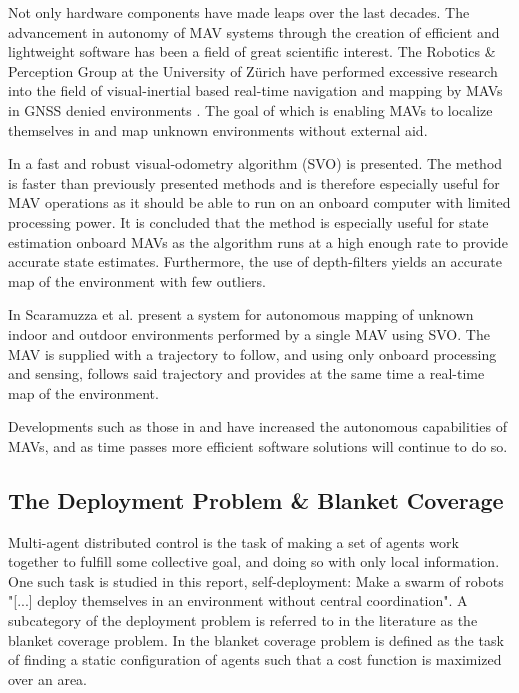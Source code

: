 Not only hardware components have made leaps over the last decades. The advancement in autonomy of MAV systems through the creation of efficient and lightweight software has been a field of great scientific interest.
The Robotics \& Perception Group at the University of Z\"urich have performed excessive research into the field of visual-inertial based real-time navigation and mapping
by MAVs in GNSS denied environments \cite{svo2, svo1}. The goal of which is enabling MAVs to localize themselves in and map unknown environments without external aid.

In \cite{svo2} a fast and robust visual-odometry algorithm (SVO) is presented. The method is faster than previously presented methods and is therefore especially useful 
for MAV operations as it should be able to run on an onboard computer with limited processing power. It is concluded that the method is especially useful for state estimation onboard MAVs as the algorithm runs
at a high enough rate to provide accurate state estimates. Furthermore, the use of depth-filters yields an accurate map of the environment with few outliers.

In \cite{svo1} Scaramuzza et al. present a system for autonomous mapping of unknown indoor and outdoor environments performed by a single MAV using SVO. The MAV is supplied with 
a trajectory to follow, and using only onboard processing and sensing, follows said trajectory and provides at the same time a real-time map of the environment.

Developments such as those in \cite{svo2} and \cite{svo1} have increased the autonomous capabilities of MAVs, and as time passes more efficient software solutions will continue to do so.

\subsection{The Deployment Problem \& Blanket Coverage}
Multi-agent distributed control is the task of making a set of agents work together to fulfill some collective goal, and doing so 
with only local information. One such task is studied in this report, self-deployment: Make a swarm of robots "[...] deploy 
themselves in an environment without central coordination"\cite{BAYINDIR2016292}. A subcategory of the deployment problem is referred to 
in the literature as the blanket coverage problem. In \cite{BAYINDIR2016292} the blanket coverage problem is defined as the task of finding a static 
configuration of agents such that a cost function is maximized over an area.

